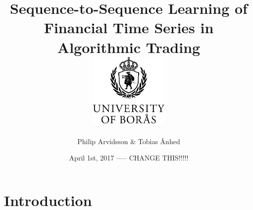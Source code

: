 \documentclass[11pt,twoside,openright]{book}
\title{
  {\huge{Sequence-to-Sequence Learning of Financial Time Series in Algorithmic Trading}}\\
  \vspace{26mm}
  \includegraphics[width=144px,height=134px]{HB_EN_logo1_K}
  \vspace{8mm}
}
\author{\huge{Philip Arvidsson \& Tobias Ånhed}}
\date{\LARGE{April 1st, 2017 ----- CHANGE THIS!!!!!}}
\begin{document}
\maketitle

\tableofcontents

\chapter{Introduction}

\end{document}
